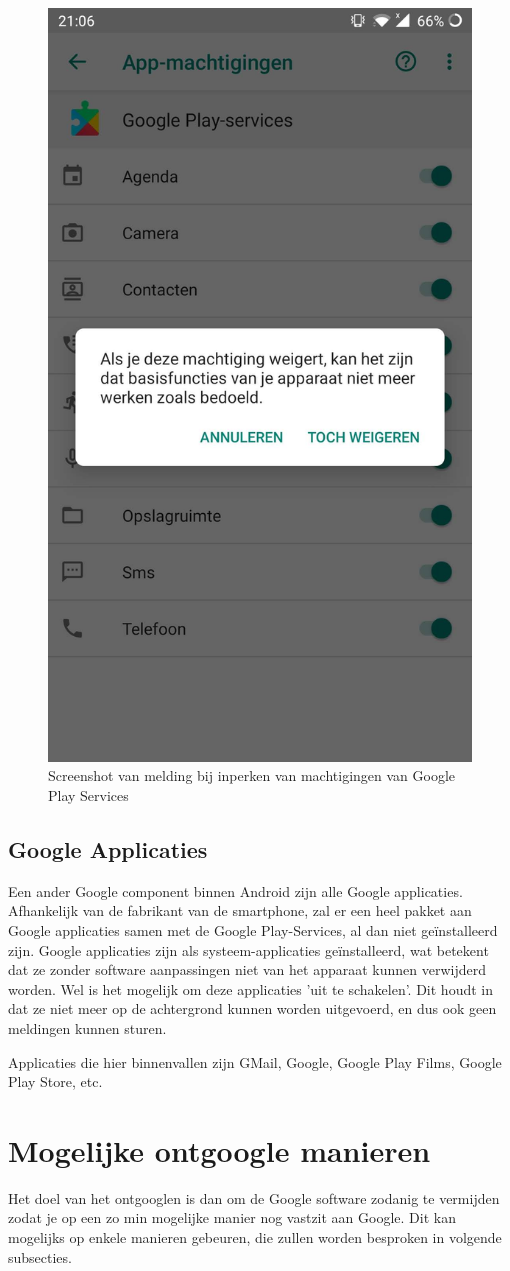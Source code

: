 \begin{figure}
    \includegraphics[width=0.4\linewidth]{img/machtigingen_melding.jpg}
    \caption{Screenshot van melding bij inperken van machtigingen van Google Play Services}
    \label{fig:permissions2}
\end{figure}

\subsection{Google Applicaties}

Een ander Google component binnen Android zijn alle Google applicaties. Afhankelijk van de fabrikant van de smartphone, zal er een heel pakket aan Google applicaties samen met de Google Play-Services, al dan niet geïnstalleerd zijn. Google applicaties zijn als systeem-applicaties geïnstalleerd, wat betekent dat ze zonder software aanpassingen niet van  het apparaat kunnen verwijderd worden. Wel is het mogelijk om deze applicaties 'uit te schakelen'. Dit houdt in dat ze niet meer op de achtergrond kunnen worden uitgevoerd, en dus ook geen meldingen kunnen sturen.

Applicaties die hier binnenvallen zijn GMail, Google, Google Play Films, Google Play Store, etc.

\section{Mogelijke ontgoogle manieren}

Het doel van het ontgooglen is dan om de Google software zodanig te vermijden zodat je op  een zo min mogelijke manier nog vastzit aan Google. Dit kan mogelijks op enkele manieren gebeuren, die zullen worden besproken in volgende subsecties.

